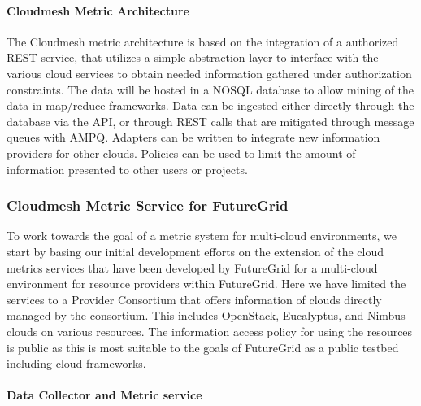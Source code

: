 \documentclass{tex/sig-alternate-2013}
\newcommand{\todo}[1]{{\color{red}{#1}}}
\begin{document}
{\paragraph{Cloudmesh Metric Architecture}

\todo{READ}

The Cloudmesh metric architecture is based on the integration of a
authorized REST service, that utilizes a simple abstraction layer to interface
with the various cloud services to obtain needed information gathered
under authorization constraints. The data will be hosted in a NOSQL
database to allow mining of the data in map/reduce frameworks. Data
can be ingested either directly through the database via the API, or
through REST calls that are mitigated through message queues with
AMPQ. Adapters can be written to integrate new information providers
for other clouds. Policies can be used to limit the amount of
information presented to other users or projects.

\subsubsection{Cloudmesh Metric Service for FutureGrid}

\todo{READ}

To work towards the goal of a metric system for multi-cloud
environments, we start by basing our initial
development efforts on the extension of the cloud metrics services
that have been developed by FutureGrid for a multi-cloud environment
for resource providers within FutureGrid. Here we have limited the
services to a Provider Consortium that offers information of clouds
directly managed by the consortium. This includes OpenStack,
Eucalyptus, and Nimbus clouds on various resources. The information
access policy for using the resources is public as this is most
suitable to the goals of FutureGrid as a public testbed including
cloud frameworks. 

\paragraph{Data Collector and Metric service}

\todo{READ}


}
\end{document}
